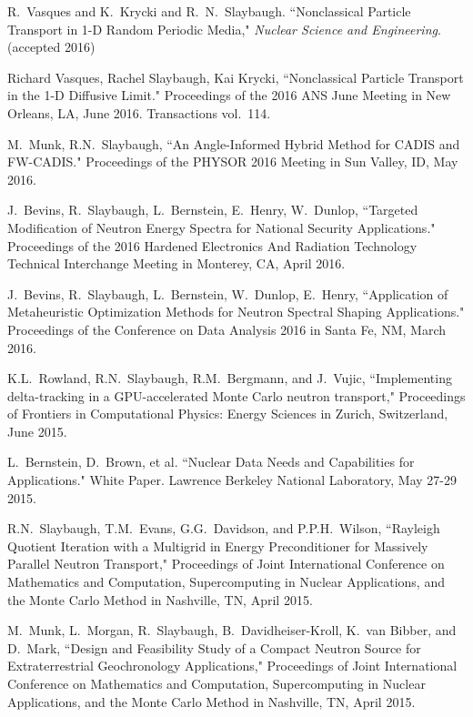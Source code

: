 \begin{bibsection}
\item R.\ Vasques and K.\ Krycki and R.\ N.\ Slaybaugh. ``Nonclassical Particle Transport in 1-D Random Periodic Media," \textit{Nuclear Science and Engineering}. (accepted 2016)

\item Richard Vasques, Rachel Slaybaugh, Kai Krycki, ``Nonclassical Particle Transport in the 1-D Diffusive Limit." Proceedings of the 2016 ANS June Meeting in New Orleans, LA, June 2016. Transactions vol.\ 114.

\item M.\ Munk, R.N.\ Slaybaugh, ``An Angle-Informed Hybrid Method for CADIS and FW-CADIS." Proceedings of the PHYSOR 2016 Meeting in Sun Valley, ID, May 2016. 

\item J.\ Bevins, R.\ Slaybaugh, L.\ Bernstein, E.\ Henry, W.\ Dunlop, ``Targeted Modification of Neutron Energy Spectra for National Security Applications." Proceedings of the 2016 Hardened Electronics And Radiation Technology Technical Interchange Meeting in Monterey, CA, April 2016. 

\item J.\ Bevins, R.\ Slaybaugh, L.\ Bernstein, W.\ Dunlop, E.\ Henry, ``Application of Metaheuristic Optimization Methods for Neutron Spectral Shaping Applications." Proceedings of the Conference on Data Analysis 2016 in Santa Fe, NM, March 2016. 

\item K.L.\ Rowland, R.N.\ Slaybaugh, R.M.\ Bergmann, and J.\ Vujic, ``Implementing delta-tracking in a GPU-accelerated Monte Carlo neutron transport," Proceedings of Frontiers in Computational Physics: Energy Sciences in Zurich, Switzerland, June 2015. 

\item L.\ Bernstein, D.\ Brown, et al. ``Nuclear Data Needs and Capabilities for Applications." White Paper. Lawrence Berkeley National Laboratory, May 27-29 2015. 

\item  R.N.\ Slaybaugh, T.M.\ Evans, G.G.\ Davidson, and P.P.H.\ Wilson, ``Rayleigh Quotient Iteration with a Multigrid in Energy Preconditioner for Massively Parallel Neutron Transport," Proceedings of Joint International Conference on Mathematics and Computation, Supercomputing in Nuclear Applications, and the Monte Carlo Method in Nashville, TN, April 2015.

\item  M.\ Munk, L.\ Morgan, R.\ Slaybaugh, B.\ Davidheiser-Kroll, K.\ van Bibber, and D.\ Mark, ``Design and Feasibility Study of a Compact Neutron Source for Extraterrestrial Geochronology Applications," Proceedings of Joint International Conference on Mathematics and Computation, Supercomputing in Nuclear Applications, and the Monte Carlo Method in Nashville, TN, April 2015.


\end{bibsection}
